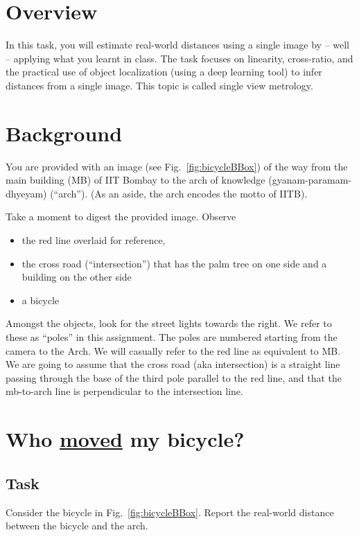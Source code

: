 
\section{Overview}

In this task, you will estimate real-world distances using a single
image by -- well -- applying what you learnt in class. The task
focuses on  linearity, cross-ratio, and the practical use
of object localization (using a  deep learning tool) to infer
distances from a single image. This topic is called single view metrology.

\section{Background}

You are provided with an image (see Fig.~\ref{fig:bicycleBBox}) of
the way from the main building
(MB) of IIT Bombay to the arch of knowledge (gyanam-paramam-dhyeyam) (``arch''). (As an aside, the arch encodes the motto of IITB).

Take a moment to digest the provided image. Observe
\begin{itemize} 
\item the red line overlaid for reference, 
\item the cross road (``intersection'') that has the palm tree on one side and a building
on the other side
\item a bicycle
\end{itemize}

Amongst the  objects, look for the street lights  towards the right. We refer to these as 
``poles'' in this assignment. The poles are numbered starting from the camera to the Arch. We will casually refer to the red line as equivalent to MB.
We are
going to assume that the cross road (aka intersection)  is a straight line passing
through the base of the third pole parallel to the red
line, and that the mb-to-arch line is perpendicular to
the intersection line.


\section{Who \href{https://en.wikipedia.org/wiki/Who_Moved_My_Cheese\%3F}{moved} my bicycle?}%

\subsection{Task}
Consider the bicycle in
Fig.~\ref{fig:bicycleBBox}. Report the real-world distance between the
bicycle and the arch.

